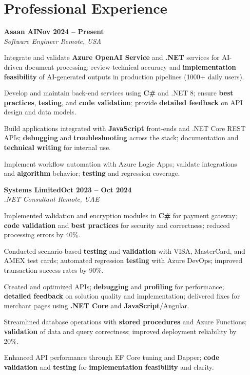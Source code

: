 \documentclass[letterpaper,10pt]{article}
\newcommand{\headingBf}[2]{
  \hspace{10pt}\textbf{#1}\hfill\textbf{#2}\\
}
\newcommand{\headingIt}[2]{
  \hspace{10pt}\textit{#1}\hfill\textit{#2}\\
}
\newenvironment{resume_list}{
  \vspace{-7pt}
  \begin{itemize}[itemsep=-2px, parsep=1pt, leftmargin=30pt]
}{
  \end{itemize}
}
\begin{document}
\section{Professional Experience}

\headingBf{Asaan AI}{Nov 2024 -- Present}
\headingIt{Software Engineer \hfill Remote, USA}{}
\begin{resume_list}
    \item Integrate and validate \textbf{Azure OpenAI Service} and \textbf{.NET} services for AI-driven document processing; review technical accuracy and \textbf{implementation feasibility} of AI-generated outputs in production pipelines (1000+ daily users).
    \item Develop and maintain back-end services using \textbf{C\#} and .NET 8; ensure \textbf{best practices}, \textbf{testing}, and \textbf{code validation}; provide \textbf{detailed feedback} on API design and data models.
    \item Build applications integrated with \textbf{JavaScript} front-ends and .NET Core REST APIs; \textbf{debugging} and \textbf{troubleshooting} across the stack; documentation and \textbf{technical writing} for internal use.
    \item Implement workflow automation with Azure Logic Apps; validate integrations and \textbf{algorithm} behavior; \textbf{testing} and regression coverage.
\end{resume_list}

\headingBf{Systems Limited}{Oct 2023 -- Oct 2024}
\headingIt{.NET Consultant \hfill Remote, UAE}{}
\begin{resume_list}
    \item Implemented validation and encryption modules in \textbf{C\#} for payment gateway; \textbf{code validation} and \textbf{best practices} for security and correctness; reduced processing errors by 40\%.
    \item Conducted scenario-based \textbf{testing} and \textbf{validation} with VISA, MasterCard, and AMEX test cards; automated regression \textbf{testing} with Azure DevOps; improved transaction success rates by 90\%.
    \item Created and optimized APIs; \textbf{debugging} and \textbf{profiling} for performance; \textbf{detailed feedback} on solution quality and implementation; delivered fixes for merchant pages using \textbf{.NET Core} and \textbf{JavaScript}/Angular.
    \item Streamlined database operations with \textbf{stored procedures} and Azure Functions; \textbf{validation} of data and query correctness; improved deployment reliability by 20\%.
    \item Enhanced API performance through EF Core tuning and Dapper; \textbf{code validation} and \textbf{testing} for \textbf{implementation feasibility} and clarity.
\end{resume_list}
\end{document}
